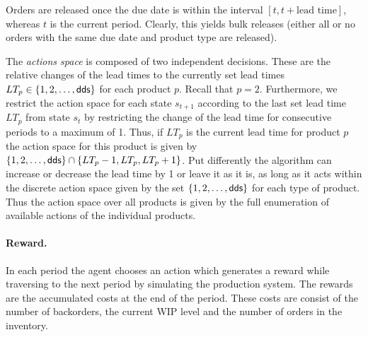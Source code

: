 \documentclass[envcountsame]{llncs}
\begin{document}
Orders are released once the due date is within the interval $[t,t+\text{lead time}]$, whereas $t$
is the current period. Clearly, this yields bulk releases (either all or no orders with the same
due date and product type are released). %

The \textit{actions space} is composed of two independent decisions. These are the relative changes
of the lead times to the currently set lead times $LT_{p} \in \{1,2,\ldots,\textsf{dds}\}$ for each product
$p$. Recall that $p=2$.
Furthermore, we restrict the action space for each state $s_{t+1}$ according to the last set lead
time $LT_{p}$ from state $s_{t}$ by restricting the change of the lead time for consecutive
periods to a maximum of 1. Thus, if $LT_{p}$ is the current lead time for product $p$ the action
space for this product is given by $\{1,2,\ldots,\textsf{dds}\} \cap \{LT_{p}-1,LT_{p},LT_{p}+1\}$. Put
differently the algorithm can increase or decrease the lead time by 1 or leave it as it is, as
long as it acts within the discrete action space given by the set $\{1,2,\ldots,\textsf{dds}\}$ for each
type of product. Thus the action space over all products is given by the full enumeration of
available actions of the individual products.



\paragraph*{Reward.}
In each period the agent chooses an action which generates a reward while traversing to the next
period by simulating the production system. The rewards are the accumulated costs at the end of the
period. These costs are consist of the number of backorders, the current WIP level and the number of
orders in the inventory.
\end{document}
